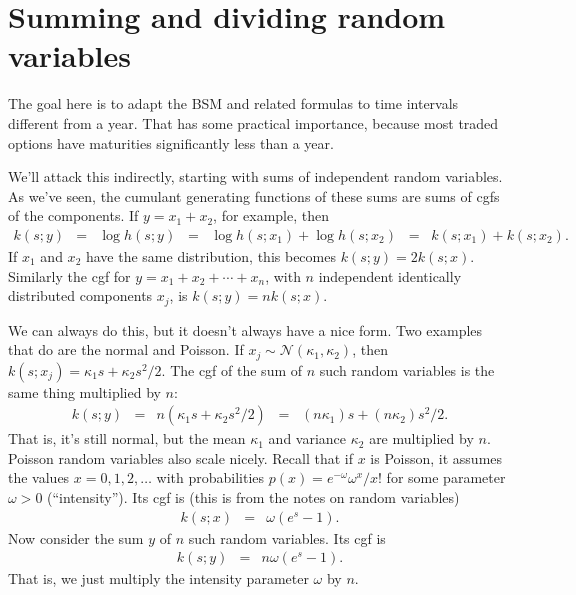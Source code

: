 \documentclass[11pt]{article}
\begin{document}
\section{Summing and dividing random variables}

The goal here is to adapt the BSM and related formulas
to time intervals different from a year.
That has some practical importance, because
most traded options have maturities significantly less than a year.

We'll attack this indirectly, starting with sums
of independent random variables.
As we've seen, the cumulant generating functions of
these sums are sums of cgfs of the components.
If $y = x_1 + x_2$, for example, then
\begin{eqnarray*}
    k(s; y) &=& \log h(s; y)
            \;\;=\;\; \log h(s; x_1) + \log h(s; x_2)
            \;\;=\;\; k(s; x_1) + k(s; x_2) .
\end{eqnarray*}
If $x_1$ and $x_2$ have the same distribution,
this becomes $ k(s; y) = 2 k(s; x)$.
Similarly the cgf for $ y = x_1 + x_2 + \cdots + x_n$,
with $n$ independent identically distributed components $x_j$, is
$  k(s; y) =  n k(s; x) $.

We can always do this, but it doesn't always have a nice form.
Two examples that do are the normal and Poisson.
If $x_j \sim \mathcal{N}(\kappa_1, \kappa_2)$,
then $ k(s; x_j) = \kappa_1 s + \kappa_2 s^2/2 $.
The cgf of the sum of $n$ such random variables is
the same thing multiplied by $n$:
\begin{eqnarray*}
    k(s; y) &=& n ( \kappa_1 s + \kappa_2 s^2/2 )
            \;\;=\;\; (n \kappa_1) s + (n\kappa_2) s^2/2 .
\end{eqnarray*}
That is, it's still normal, but the mean $\kappa_1$
and variance $\kappa_2$ are multiplied by $n$.
Poisson random variables also scale nicely.
Recall that if $x$ is Poisson, it assumes the values $x= 0, 1, 2, \ldots $
with probabilities
$  p(x) = e^{-\omega} \omega^x / x! $
for some parameter $\omega > 0$ (``intensity'').
Its cgf is (this is from the notes on random variables)
\begin{eqnarray*}
    k(s; x) &=& \omega \left( e^{s} -1 \right) .
\end{eqnarray*}
Now consider the sum $y$ of $n$ such random variables.
Its cgf is
\begin{eqnarray*}
    k(s; y) &=& n \omega \left( e^{s} -1 \right) .
\end{eqnarray*}
That is, we just multiply the intensity parameter $\omega$ by $n$.
\end{document}
